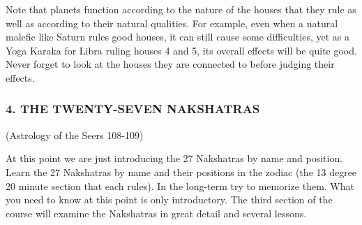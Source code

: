 Note that planets function according to the nature of the houses that they rule as well as according to their natural qualities. For example, even when a natural malefic like Saturn rules good houses, it can still cause some difficulties, yet as a Yoga Karaka for Libra ruling houses 4 and 5, its overall effects will be quite good. Never forget to look at the houses they are connected to before judging their effects.

\subsubsection{4. THE TWENTY-SEVEN NAKSHATRAS} (Astrology of the Seers 108-109)
 

At this point we are just introducing the 27 Nakshatras by name and position.  Learn the 27 Nakshatras by name and their positions in the zodiac (the 13 degree 20 minute section that each rules). In the long-term try to memorize them. What you need to know at this point is only introductory. The third section of the course will examine the Nakshatras in great detail and several lessons.

